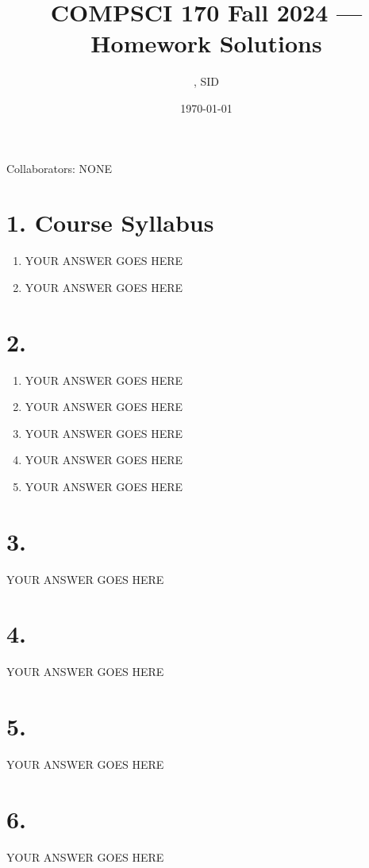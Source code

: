 \documentclass[11pt]{article}
\title{COMPSCI 170 Fall 2024 --- Homework \Homework Solutions}
\author{\Name, SID \SID}
\date{\today}
\newenvironment{qparts}{\begin{enumerate}[{(}a{)}]}{\end{enumerate}}
\begin{document}
\maketitle

Collaborators: NONE

\section*{1. Course Syllabus}
\begin{qparts}
\item
YOUR ANSWER GOES HERE

\item
YOUR ANSWER GOES HERE

\end{qparts}



\newpage
\section*{2.}
\begin{qparts}
\item
YOUR ANSWER GOES HERE

\item
YOUR ANSWER GOES HERE

\item
YOUR ANSWER GOES HERE

\item
YOUR ANSWER GOES HERE

\item
YOUR ANSWER GOES HERE

\end{qparts}


\newpage
\section*{3.}
YOUR ANSWER GOES HERE


\newpage
\section*{4.}
YOUR ANSWER GOES HERE


\newpage
\section*{5.}
YOUR ANSWER GOES HERE


\newpage
\section*{6.}
YOUR ANSWER GOES HERE
\end{document}
